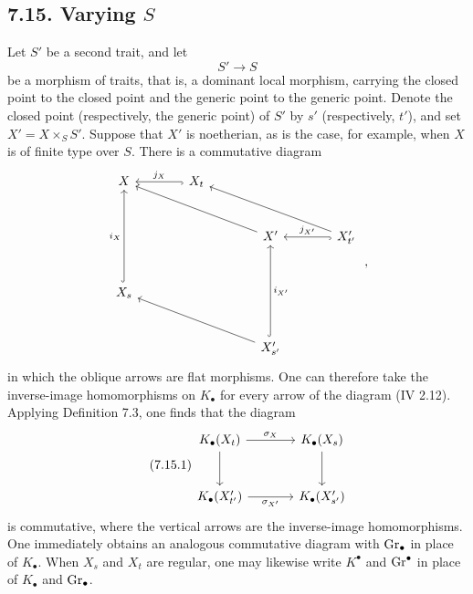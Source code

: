 \subsection*{7.15. Varying $S$}
Let $S'$ be a second trait, and let
\[
S'\longrightarrow S
\]
be a morphism of traits, that is, a dominant local morphism, carrying the
closed point to the closed point and the generic point to the generic point.
Denote the closed point (respectively, the generic point) of $S'$ by $s'$
(respectively, $t'$), and set $X'=X\times_SS'$. Suppose that $X'$ is
noetherian, as is the case, for example, when $X$ is of finite type over $S$.
There is a commutative diagram
\[
\begin{tikzcd}[column sep=large,row sep=large]
X & X_t \arrow[l,hook,"j_X"'] & & \\
& & X' \arrow[ull] & X'_{t'} \arrow[l,hook,"j_{X'}"'] \arrow[ull] \\
X_s \arrow[uu,hook,"i_X"] & & & \\
& & X'_{s'} \arrow[uu,hook,"i_{X'}"'] \arrow[ull] &
\end{tikzcd}
\;,
\]
in which the oblique arrows are flat morphisms. One can therefore take the
inverse-image homomorphisms on $K_\bullet$ for every arrow of the diagram
(IV 2.12). Applying Definition 7.3, one finds that the diagram
\begin{equation}\tag{7.15.1}
\begin{tikzcd}[column sep=large,row sep=large]
K_\bullet(X_t) \arrow[r,"\sigma_X"] \arrow[d] &
K_\bullet(X_s) \arrow[d]\\
K_\bullet(X'_{t'}) \arrow[r,"\sigma_{X'}"'] &
K_\bullet(X'_{s'})
\end{tikzcd}
\end{equation}
is commutative, where the vertical arrows are the inverse-image
homomorphisms. One immediately obtains an analogous commutative diagram with
$\operatorname{Gr}_\bullet$ in place of $K_\bullet$. When $X_s$ and $X_t$ are regular, one
may likewise write $K^\bullet$ and $\operatorname{Gr}^\bullet$ in place of $K_\bullet$ and
$\operatorname{Gr}_\bullet$.







